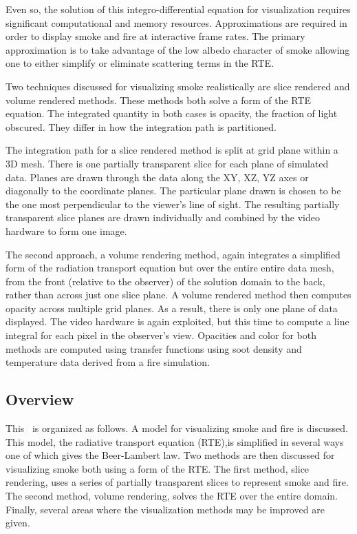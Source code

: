 Even so, the solution of this integro-differential equation for visualization requires significant computational and memory  resources.  Approximations are required in order to display smoke and fire at interactive frame rates.  The primary approximation is to take advantage of the low albedo character of smoke allowing one to either simplify or eliminate scattering terms in the RTE.

Two techniques discussed for visualizing smoke realistically are slice rendered and volume rendered methods\cite{levoy:1988,Engel:2006}.    These methods both solve a form of the RTE equation.  The integrated quantity in both cases is opacity, the fraction of light obscured.  They differ in how the integration path is partitioned.

The integration path for a slice rendered method is split at grid plane within a 3D mesh. There is one partially transparent slice for each plane of simulated data. Planes are drawn through the data along the XY, XZ, YZ axes or diagonally to the coordinate planes.  The particular plane drawn is chosen to be the one most perpendicular to the viewer's line of sight.
The resulting partially transparent slice planes are drawn individually and combined by the video hardware to form one image.

The second approach, a volume rendering method, again integrates a simplified form of the radiation transport equation but over the entire entire data mesh, from the front (relative to the observer) of the solution domain to the back, rather than across just one slice plane. A volume rendered method then computes opacity across multiple grid planes.  As a result, there is only one plane of data displayed.  The video hardware is again exploited, but this time to compute a line integral for each pixel in the observer's view.  Opacities and color for both methods are computed using transfer functions using soot density and temperature data derived from a fire simulation.

\subsection{Overview}
This \paper\ is organized as follows.  A model for visualizing smoke and fire is discussed.  This model, the radiative transport equation (RTE),is simplified in several ways one of which gives the Beer-Lambert law.  Two methods are then discussed for visualizing smoke  both using a form of the RTE.  The first method, slice rendering,  uses a series of partially transparent slices to represent smoke and fire. The second method, volume rendering, solves the RTE over the entire domain. Finally, several areas where the visualization methods may be improved are given.

